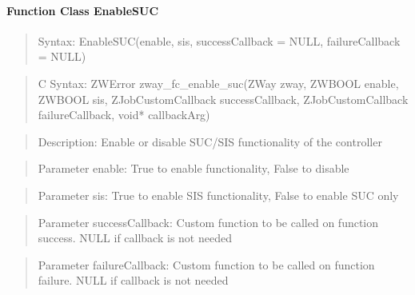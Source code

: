 \paragraph{Function Class EnableSUC}
\begin{quote}Syntax: EnableSUC(enable, sis, successCallback = NULL, failureCallback = NULL)\end{quote}
\begin{quote}C Syntax: ZWError zway\_fc\_enable\_suc(ZWay zway, ZWBOOL enable, ZWBOOL sis, ZJobCustomCallback successCallback, ZJobCustomCallback failureCallback, void* callbackArg)\end{quote}
\begin{quote}Description: Enable or disable SUC/SIS functionality of the controller\end{quote}
\begin{quote}Parameter enable: True to enable functionality, False to disable\end{quote}
\begin{quote}Parameter sis: True to enable SIS functionality, False to enable SUC only\end{quote}
\begin{quote}Parameter successCallback: Custom function to be called on function success. NULL if callback is not needed\end{quote}
\begin{quote}Parameter failureCallback: Custom function to be called on function failure. NULL if callback is not needed\end{quote}


